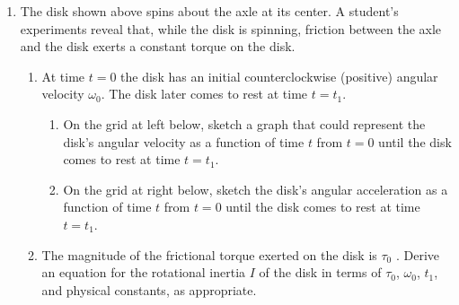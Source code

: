 \documentclass{../../../oss-apphys}
\begin{document}
\begin{enumerate}[leftmargin=15pt]
  \begin{center}
  \end{center}
\item The disk shown above spins about the axle at its center. A student's
  experiments reveal that, while the disk is spinning, friction between the
  axle and the disk exerts a constant torque on the disk.
  \begin{enumerate}[leftmargin=15pt]
  \item At time $t=0$ the disk has an initial counterclockwise (positive)
    angular velocity $\omega_0$. The disk later comes to rest at time $t=t_1$.
    \begin{enumerate}[leftmargin=15pt]
    \item On the grid at left below, sketch a graph that could represent the
      disk's angular velocity as a function of time $t$ from $t=0$ until the
      disk comes to rest at time $t=t_1$.   
    \item On the grid at right below, sketch the disk's angular acceleration as
      a function of time $t$ from $t=0$ until the disk comes to rest at time
      $t=t_1$.   
    \end{enumerate}
    \begin{center}
  \end{center}
  \item The magnitude of the frictional torque exerted on the disk is
    $\tau_0$ . Derive an equation for the rotational inertia $I$ of the disk in
    terms of $\tau_0$, $\omega_0$, $t_1$, and physical constants, as
    appropriate.
    \vspace{.75in}
    \newpage
    

\end{enumerate}
\end{enumerate}
\end{document}
